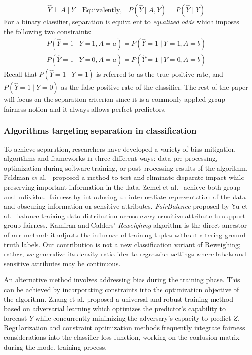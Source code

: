 \begin{equation}\label{separation}
\hat{Y} \perp A \mid Y
\quad \text{Equivalently,} \quad
P(\hat{Y} \mid A, Y) = P(\hat{Y} \mid Y)
\end{equation}
For a binary classifier, separation is equivalent to \emph{equalized odds} \cite{hardt2016equality} which imposes the following two constraints:
\begin{gather}
P(\hat{Y} = 1 \mid Y=1, A=a) = P(\hat{Y} = 1 \mid Y=1, A=b) \\
P(\hat{Y} = 1 \mid Y=0, A=a) = P(\hat{Y} = 1 \mid Y=0, A=b)
\end{gather}
Recall that $P(\hat{Y} = 1 \mid Y=1)$ is referred to as the true positive rate, and $P(\hat{Y} = 1 \mid Y=0)$ as the false positive rate of the classifier. The rest of the paper will focus on the separation criterion since it is a commonly applied group fairness notion and it always allows perfect predictors.

\subsubsection{Algorithms targeting separation in classification}
To achieve separation, researchers have developed a variety of bias mitigation algorithms and frameworks in three different ways: data pre-processing, optimization during software training, or post-processing results of the algorithm. Feldman et al.~\cite{feldman15} proposed a method to test and eliminate disparate impact while preserving important information in the data. Zemel et al.~\cite{zemel13} achieve both group and individual fairness by introducing an intermediate representation of the data and obscuring information on sensitive attributes. \emph{FairBalance} proposed by Yu et al.~\cite{yu2024fairbalance} balance training data distribution across every sensitive attribute to support group fairness. Kamiran and Calders' \emph{Reweighing} algorithm \cite{kamiran12} is the direct ancestor of our method: it adjusts the influence of training tuples without altering ground-truth labels. Our contribution is not a new classification variant of Reweighing; rather, we generalize its density ratio idea to regression settings where labels and sensitive attributes may be continuous.

An alternative method involves addressing bias during the training phase. This can be achieved by incorporating constraints into the optimization objective of the algorithm. Zhang et al.\cite{zhang2018mitigating} proposed a universal and robust training method based on adversarial learning which optimizes the predictor's capability to forecast $Y$ while concurrently minimizing the adversary's capacity to predict $Z$. Regularization and constraint optimization methods frequently integrate fairness considerations into the classifier loss function, working on the confusion matrix during the model training process.

